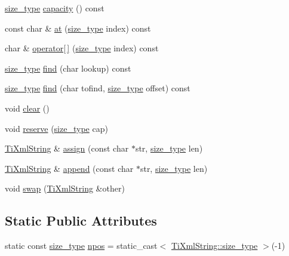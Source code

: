 \begin{DoxyCompactItemize}
\hyperlink{classTiXmlString_abeb2c1893a04c17904f7c06546d0b971}{size\_\-type} \hyperlink{classTiXmlString_a76e4d6aba7845f4cf9c02332a5fbf916}{capacity} () const 
\item 
const char \& \hyperlink{classTiXmlString_a6763093267bbdecbf03f8840bc349877}{at} (\hyperlink{classTiXmlString_abeb2c1893a04c17904f7c06546d0b971}{size\_\-type} index) const 
\item 
char \& \hyperlink{classTiXmlString_ae8cdc1d46c538536b786f7ae03c0c1d9}{operator\mbox{[}$\,$\mbox{]}} (\hyperlink{classTiXmlString_abeb2c1893a04c17904f7c06546d0b971}{size\_\-type} index) const 
\item 
\hyperlink{classTiXmlString_abeb2c1893a04c17904f7c06546d0b971}{size\_\-type} \hyperlink{classTiXmlString_a5c2b368b5eafe075fd9565cbcbd4c2f9}{find} (char lookup) const 
\item 
\hyperlink{classTiXmlString_abeb2c1893a04c17904f7c06546d0b971}{size\_\-type} \hyperlink{classTiXmlString_a5f2a6fd565751410b392f249a9786db4}{find} (char tofind, \hyperlink{classTiXmlString_abeb2c1893a04c17904f7c06546d0b971}{size\_\-type} offset) const 
\item 
void \hyperlink{classTiXmlString_ab20e06e4c666abf3bdbfb3a1191d4888}{clear} ()
\item 
void \hyperlink{classTiXmlString_a88ecf9f0f00cb5c67b6b637958d7049c}{reserve} (\hyperlink{classTiXmlString_abeb2c1893a04c17904f7c06546d0b971}{size\_\-type} cap)
\item 
\hyperlink{classTiXmlString}{TiXmlString} \& \hyperlink{classTiXmlString_ac72f3d9149b7812c1e6c59402014d0d5}{assign} (const char $\ast$str, \hyperlink{classTiXmlString_abeb2c1893a04c17904f7c06546d0b971}{size\_\-type} len)
\item 
\hyperlink{classTiXmlString}{TiXmlString} \& \hyperlink{classTiXmlString_ad44b21700d2ec24a511367b222b643fb}{append} (const char $\ast$str, \hyperlink{classTiXmlString_abeb2c1893a04c17904f7c06546d0b971}{size\_\-type} len)
\item 
void \hyperlink{classTiXmlString_aa392cbc180752a79f007f4f9280c7762}{swap} (\hyperlink{classTiXmlString}{TiXmlString} \&other)
\end{DoxyCompactItemize}
\subsection*{Static Public Attributes}
\begin{DoxyCompactItemize}
\item 
static const \hyperlink{classTiXmlString_abeb2c1893a04c17904f7c06546d0b971}{size\_\-type} \hyperlink{classTiXmlString_a8f4422d227088dc7bec96f479b275d0a}{npos} = static\_\-cast$<$ \hyperlink{classTiXmlString_abeb2c1893a04c17904f7c06546d0b971}{TiXmlString::size\_\-type} $>$(-\/1)
\end{DoxyCompactItemize}


